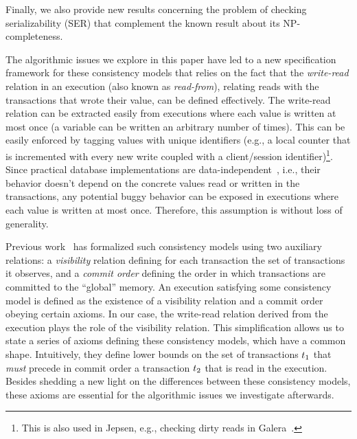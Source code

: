 Finally, we also provide new results concerning the problem of checking serializability (SER) that complement the known result about its NP-completeness. 

The algorithmic issues we explore in this paper have led to a new specification framework for these consistency models that relies on the fact that the \emph{write-read} relation in an execution (also known as \emph{read-from}), relating reads with the transactions that wrote their value, can be defined effectively. The write-read relation can be extracted easily from executions where each value is written at most once (a variable can be written an arbitrary number of times). This can be easily enforced by tagging values with unique identifiers (e.g., a local counter that is incremented with every new write coupled with a client/session identifier)\footnote{This is also used in Jepsen, e.g., checking dirty reads in Galera~\cite{jepsen-galera}.}. Since practical database implementations are data-independent~\cite{DBLP:conf/popl/Wolper86}, i.e., their behavior doesn't depend on the concrete values read or written in the transactions, any potential buggy behavior can be exposed in executions where each value is written at most once. Therefore, this assumption is without loss of generality.

Previous work~\cite{DBLP:conf/popl/BouajjaniEGH17,DBLP:conf/popl/BurckhardtGYZ14,DBLP:conf/concur/Cerone0G15} has formalized such consistency models using two auxiliary relations: a \emph{visibility} relation defining for each transaction the set of transactions it observes, and a \emph{commit order} defining the order in which transactions are committed to the ``global'' memory. An execution satisfying some consistency model is defined as the existence of a visibility relation and a commit order obeying certain axioms. In our case, the write-read relation derived from the execution plays the role of the visibility relation. This simplification allows us to state a series of axioms defining these consistency models, which have a common shape. Intuitively, they define lower bounds on the set of transactions ${t}_1$ that \emph{must} precede in commit order a transaction ${t}_2$ that is read in the execution. Besides shedding a new light on the differences between these consistency models, these axioms are essential for the algorithmic issues we investigate afterwards.

